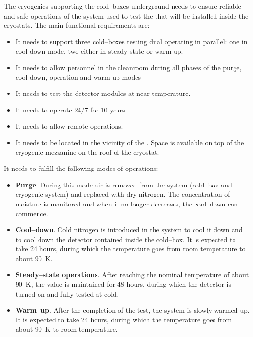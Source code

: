 \label{sec:fdsp-tc-cryocoldbox}

The cryogenics supporting the cold--boxes underground needs to ensure reliable and safe operations of the system used to test the  that will be installed inside the cryostats. The main functional requirements are:
\begin{itemize}
\setlength\itemsep{1mm}
\setlength{\parsep}{1mm}
\setlength{\itemsep}{-5mm}
\item It needs to support three cold--boxes testing dual  operating in parallel: one in cool down mode, two either in steady-state or warm-up.
\item It needs to allow personnel in the cleanroom during all phases of the purge, cool down, operation and warm-up modes 
\item It needs to test the detector modules at near  temperature.
\item It needs to operate 24/7 for 10 years.
\item It needs to allow remote operations.
\item It needs to be located in the vicinity of the . Space is available on top of the cryogenic mezzanine on the roof of the cryostat.
\end{itemize}

It needs to fulfill the following modes of operations:

\begin{itemize}
\setlength\itemsep{1mm}
\setlength{\parsep}{1mm}
\setlength{\itemsep}{-5mm}
\item \textbf{Purge}. During this mode air is removed from the system (cold--box and cryogenic system) and replaced with dry nitrogen. The concentration of moisture is monitored and when it no longer decreases, the cool--down can commence.
\item \textbf{Cool--down}. Cold nitrogen is introduced in the system to cool it down and to cool down the detector contained inside the cold--box. It is expected to take 24 hours, during which the temperature goes from room temperature to about \SI{90}{K}. 
\item \textbf{Steady--state operations}. After reaching the nominal temperature of about \SI{90}{K}, the value is maintained for 48 hours, during which the detector is turned on and fully tested at cold. 
\item \textbf{Warm--up}. After the completion of the test, the system is slowly warmed up. It is expected to take 24 hours, during which the temperature goes from about \SI{90}{K} to room temperature.
\end{itemize}

